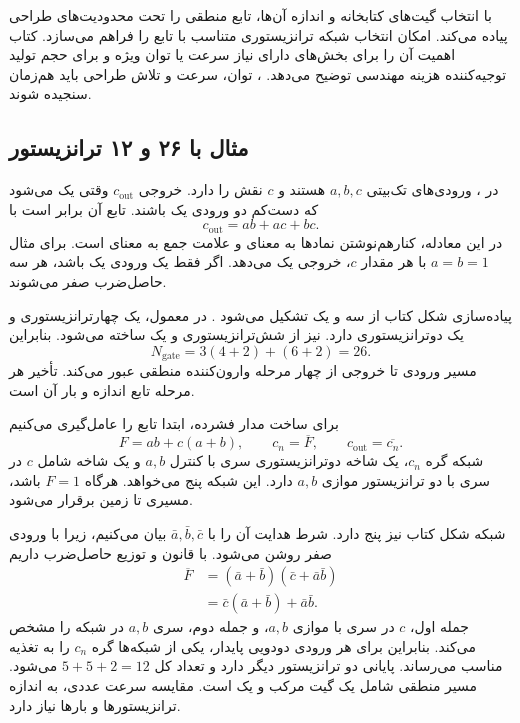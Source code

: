  با انتخاب گیت‌های کتابخانه و اندازه آن‌ها، تابع منطقی را تحت
محدودیت‌های طراحی پیاده می‌کند.  امکان انتخاب شبکه
ترانزیستوری متناسب با تابع را فراهم می‌سازد. کتاب اهمیت آن را برای بخش‌های دارای
نیاز سرعت یا توان ویژه و برای حجم تولید توجیه‌کننده هزینه مهندسی توضیح می‌دهد.
، توان، سرعت و تلاش طراحی باید هم‌زمان سنجیده شوند.

\subsection{مثال  با ۲۶ و ۱۲ ترانزیستور}
در ، ورودی‌های تک‌بیتی \(a,b,c\) هستند و \(c\) نقش 
را دارد. خروجی \(c_{\mathrm{out}}\) وقتی یک می‌شود که دست‌کم دو ورودی یک باشند.
تابع آن برابر است با
\begin{equation}
 c_{\mathrm{out}}=ab+ac+bc.
 \label{eq:impl-carry-majority}
\end{equation}
در این معادله، کنارهم‌نوشتن نمادها به معنای  و علامت جمع به معنای
 است. برای مثال \(a=b=1\) با هر مقدار \(c\)، خروجی یک می‌دهد.
اگر فقط یک ورودی یک باشد، هر سه حاصل‌ضرب صفر می‌شوند.

پیاده‌سازی شکل  کتاب از سه  و یک  تشکیل می‌شود
\cite{weste}.  در  معمول، یک  چهارترانزیستوری
و یک  دوترانزیستوری دارد.  نیز از  شش‌ترانزیستوری
و یک  ساخته می‌شود. بنابراین
\begin{equation*}
 N_{\mathrm{gate}}=3(4+2)+(6+2)=26.
\end{equation*}
مسیر ورودی تا خروجی از چهار مرحله وارون‌کننده منطقی عبور می‌کند.
تأخیر هر مرحله تابع اندازه و بار آن است.

برای ساخت مدار فشرده، ابتدا تابع را عامل‌گیری می‌کنیم
\begin{equation}
 F=ab+c(a+b),\qquad c_n=\overline F,\qquad c_{\mathrm{out}}=\overline{c_n}.
 \label{eq:impl-factored-carry}
\end{equation}
شبکه  گره \(c_n\)، یک شاخه دوترانزیستوری سری با کنترل \(a,b\)
و یک شاخه شامل \(c\) در سری با دو ترانزیستور موازی \(a,b\) دارد. این شبکه پنج
 می‌خواهد. هرگاه \(F=1\) باشد، مسیری تا زمین برقرار می‌شود.

شبکه  شکل کتاب نیز پنج  دارد. شرط هدایت آن را با
\(\bar a,\bar b,\bar c\) بیان می‌کنیم، زیرا  با ورودی صفر روشن می‌شود.
با قانون  و توزیع حاصل‌ضرب داریم
\begin{align*}
 \overline F
 &=(\bar a+\bar b)(\bar c+\bar a\bar b)\\
 &=\bar c(\bar a+\bar b)+\bar a\bar b.
\end{align*}
جمله اول، \(c\) در سری با موازی \(a,b\)، و جمله دوم، سری \(a,b\) در شبکه
 را مشخص می‌کند. بنابراین برای هر ورودی دودویی پایدار، یکی از شبکه‌ها
گره \(c_n\) را به تغذیه مناسب می‌رساند.  پایانی دو ترانزیستور دیگر دارد
و تعداد کل \(5+5+2=12\) می‌شود. مسیر منطقی شامل یک گیت مرکب و یک
 است. مقایسه سرعت عددی، به اندازه ترانزیستورها و بارها نیاز دارد.


